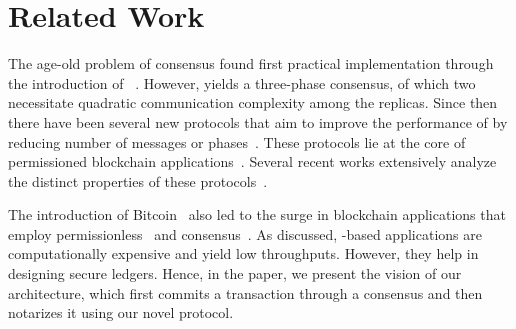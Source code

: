 \section{Related Work}
The age-old problem of \BFT{} consensus found first practical implementation 
through the introduction of \pbft~\cite{pbftj}.
However, \pbft{} yields a three-phase consensus, of which two necessitate quadratic 
communication complexity among the replicas.
Since then there have been several new \BFT{} protocols that aim to improve the 
performance of \pbft{} by reducing number of messages or phases~\cite{sharper,fireledger,ahl,sbft,poe,rcc,geobft,flexitrust,zyzzyva,ringbft,mirbft,basil,hotstuff}.
These \BFT{} protocols lie at the core of permissioned blockchain applications~\cite{xoxfabric,blockchain-book,bc-processing,blockplane,scalable-ledger}.
Several recent works extensively analyze the distinct properties of these protocols~\cite{bedrock,blockbench,bft-review}.

The introduction of Bitcoin~\cite{bitcoin} also led to the surge in blockchain applications 
that employ permissionless~\cite{red-belly,bc-processing} and \PoW{} consensus~\cite{pow}. 
As discussed, \PoW-based applications are computationally expensive and yield low throughputs. 
However, they help in designing secure ledgers. 
Hence, in the paper, we present the vision of our \DualChain{} architecture, which first commits a 
transaction through a \BFT{} consensus and then notarizes it using our novel \PoC{} protocol.

